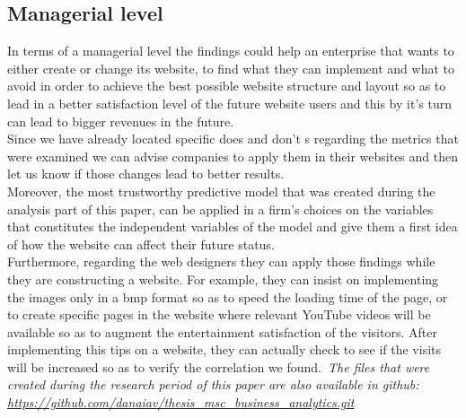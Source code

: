 \documentclass{book}
\begin{document}
\subsection{Managerial level}
In terms of a managerial level the findings could help an enterprise that wants to either create or change its website, to find what they can implement and what to avoid in order to achieve the best possible website structure and layout so as to lead in a better satisfaction level of the future website users and this by it's turn can lead to bigger revenues in the future.\\
Since we have already located specific does and don't s regarding the metrics that were examined we can advise companies to apply them in their websites and then let us know if those changes lead to better results.\\
Moreover, the most trustworthy predictive model that was created during the analysis part of this paper, can be applied in a firm's choices on the variables that constitutes the independent variables of the model and give them a first idea of how the website can affect their future status.\\
Furthermore, regarding the web designers they can apply those findings while they are constructing a website. For example, they can insist on implementing the images only in a bmp format so as to speed the loading time of the page, or to create specific pages in the website where relevant YouTube videos will be available so as to augment the entertainment satisfaction of the visitors. After implementing this tips on a website, they can actually check to see if the visits will be increased so as to verify the correlation we found.\
\textit{The files that were created during the research period of this paper are also available in github: \url{https://github.com/danaiav/thesis_msc_business_analytics.git}}
\end{document}
